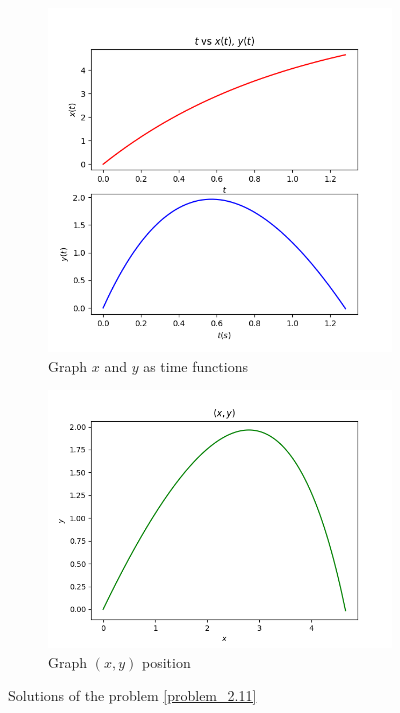     \begin{figure}[h!]
        \centering
        \begin{subfigure}[b]{\linewidth}
            \includegraphics[width=0.85\linewidth]{img/chapter2/2-11/2_11_b.png}
            \caption{Graph $x$ and $y$ as time functions}
        \end{subfigure}
        \begin{subfigure}[b]{\linewidth}
            \includegraphics[width=0.85\linewidth]{img/chapter2/2-11/2_11_c.png}
            \caption{Graph $(x,y)$ position}
        \end{subfigure}
        \caption{Solutions of the problem \ref{problem_2.11}}
        \label{fig: problem 2-11}
    \end{figure}


